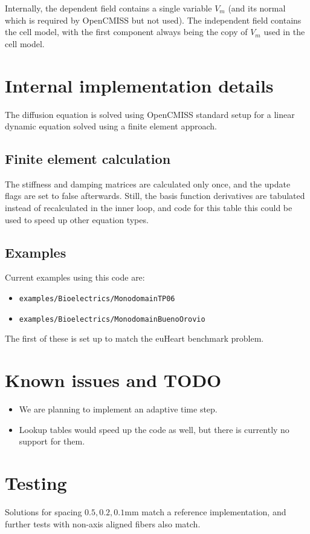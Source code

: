Internally, the dependent field contains a single variable $V_m$ (and its normal which is required by OpenCMISS but not used). The independent
field contains the cell model, with the first component always being the copy of $V_m$ used in the cell model.

\section{Internal implementation details}
The diffusion equation is solved using OpenCMISS standard setup for a linear dynamic equation solved using a finite element approach.
\subsection{Finite element calculation}
The stiffness and damping matrices are calculated only once, and the update flags are set to false afterwards.
Still, the basis function derivatives are tabulated instead of recalculated in the inner loop, and code for this table this could be used to speed up other equation types.


\subsection{Examples}
Current examples using this code are:
\begin{itemize}
 \item \verb!examples/Bioelectrics/MonodomainTP06!
 \item \verb!examples/Bioelectrics/MonodomainBuenoOrovio!
\end{itemize}
The first of these is set up to match the euHeart benchmark problem.

\section{Known issues and TODO}
\begin{itemize}
 \item We are planning to implement an adaptive time step.
 \item Lookup tables would speed up the code as well, but there is currently no support for them.
\end{itemize}

\section{Testing}
Solutions for spacing $0.5, 0.2, 0.1$mm match a reference implementation, and further tests
with non-axis aligned fibers also match.




